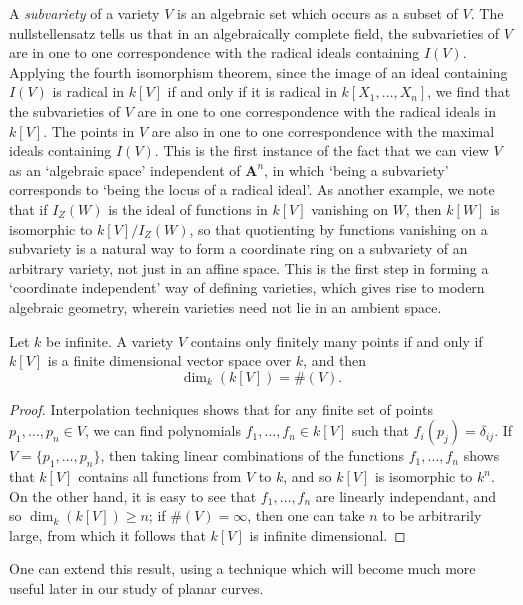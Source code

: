 A \emph{subvariety} of a variety $V$ is an algebraic set which occurs as a subset of $V$. The nullstellensatz tells us that in an algebraically complete field, the subvarieties of $V$ are in one to one correspondence with the radical ideals containing $I(V)$. Applying the fourth isomorphism theorem, since the image of an ideal containing $I(V)$ is radical in $k[V]$ if and only if it is radical in $k[X_1,\dots,X_n]$, we find that the subvarieties of $V$ are in one to one correspondence with the radical ideals in $k[V]$. The points in $V$ are also in one to one correspondence with the maximal ideals containing $I(V)$. This is the first instance of the fact that we can view $V$ as an `algebraic space' independent of $\mathbf{A}^n$, in which `being a subvariety' corresponds to `being the locus of a radical ideal'. As another example, we note that if $I_Z(W)$ is the ideal of functions in $k[V]$ vanishing on $W$, then $k[W]$ is isomorphic to $k[V]/I_Z(W)$, so that quotienting by functions vanishing on a subvariety is a natural way to form a coordinate ring on a subvariety of an arbitrary variety, not just in an affine space. This is the first step in forming a `coordinate independent' way of defining varieties, which gives rise to modern algebraic geometry, wherein varieties need not lie in an ambient space.

\begin{prop}
    Let $k$ be infinite. A variety $V$ contains only finitely many points if and only if $k[V]$ is a finite dimensional vector space over $k$, and then
    \[ \dim_k(k[V]) = \#(V). \]
\end{prop}
\begin{proof}
    Interpolation techniques shows that for any finite set of points $p_1,\dots,p_n \in V$, we can find polynomials $f_1,\dots,f_n \in k[V]$ such that $f_i(p_j) = \delta_{ij}$. If $V = \{ p_1,\dots,p_n \}$, then taking linear combinations of the functions $f_1,\dots,f_n$ shows that $k[V]$ contains all functions from $V$ to $k$, and so $k[V]$ is isomorphic to $k^n$. On the other hand, it is easy to see that $f_1,\dots,f_n$ are linearly independant, and so $\dim_k(k[V]) \geq n$; if $\#(V) = \infty$, then one can take $n$ to be arbitrarily large, from which it follows that $k[V]$ is infinite dimensional.
\end{proof}

One can extend this result, using a technique which will become much more useful later in our study of planar curves.

